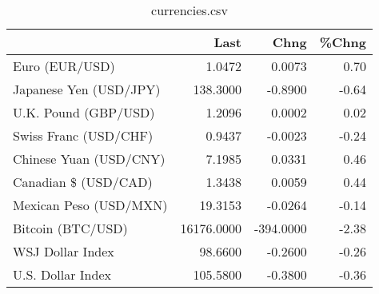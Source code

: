 \documentclass{article}%
\begin{document}
%


\begin{table}[htbp]%
\caption{currencies.csv}%
\centering%
\begin{adjustbox}{width=1\textwidth}%
\begin{tabular}{lrrr}
\toprule
                       &       Last &      Chng &  \%Chng \\
\midrule
        Euro (EUR/USD) &     1.0472 &    0.0073 &   0.70 \\
Japanese Yen (USD/JPY) &   138.3000 &   -0.8900 &  -0.64 \\
  U.K. Pound (GBP/USD) &     1.2096 &    0.0002 &   0.02 \\
 Swiss Franc (USD/CHF) &     0.9437 &   -0.0023 &  -0.24 \\
Chinese Yuan (USD/CNY) &     7.1985 &    0.0331 &   0.46 \\
  Canadian \$ (USD/CAD) &     1.3438 &    0.0059 &   0.44 \\
Mexican Peso (USD/MXN) &    19.3153 &   -0.0264 &  -0.14 \\
     Bitcoin (BTC/USD) & 16176.0000 & -394.0000 &  -2.38 \\
      WSJ Dollar Index &    98.6600 &   -0.2600 &  -0.26 \\
     U.S. Dollar Index &   105.5800 &   -0.3800 &  -0.36 \\
\bottomrule
\end{tabular}
%
\end{adjustbox}%
\end{table}

%
\end{document}
